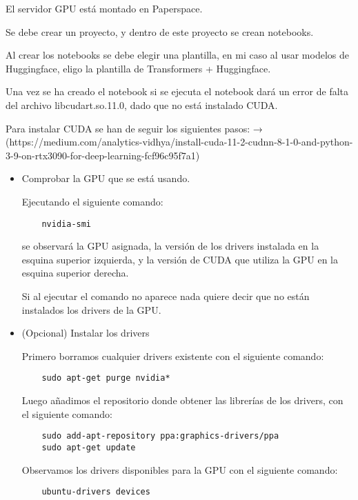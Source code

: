 El servidor GPU está montado en Paperspace.

Se debe crear un proyecto, y dentro de este proyecto se crean notebooks.

Al crear los notebooks se debe elegir una plantilla, en mi caso al usar modelos de Huggingface, eligo la plantilla de Transformers + Huggingface.

Una vez se ha creado el notebook si se ejecuta el notebook dará un error de falta del archivo libcudart.so.11.0, dado que no está instalado CUDA.

Para instalar CUDA se han de seguir los siguientes pasos: → (https://medium.com/analytics-vidhya/install-cuda-11-2-cudnn-8-1-0-and-python-3-9-on-rtx3090-for-deep-learning-fcf96c95f7a1)

\begin{itemize}
    \item Comprobar la GPU que se está usando.
    
    Ejecutando el siguiente comando:
    
    \begin{lstlisting}
    nvidia-smi
    \end{lstlisting} 
    
    se observará la GPU asignada, la versión de los drivers instalada en la esquina superior izquierda, y la versión de CUDA que utiliza la GPU en la esquina superior derecha.
    
    Si al ejecutar el comando no aparece nada quiere decir que no están instalados los drivers de la GPU.
    
    \item (Opcional) Instalar los drivers
    
    Primero borramos cualquier drivers existente con el siguiente comando:
    
    \begin{lstlisting}
    sudo apt-get purge nvidia*
    \end{lstlisting} 
    
    Luego añadimos el repositorio donde obtener las librerías de los drivers, con el siguiente comando:
    
    \begin{lstlisting}
    sudo add-apt-repository ppa:graphics-drivers/ppa
    sudo apt-get update
    \end{lstlisting}
    
    Observamos los drivers disponibles para la GPU con el siguiente comando:
    
    \begin{lstlisting}
    ubuntu-drivers devices
    \end{lstlisting}
    

\end{itemize}
